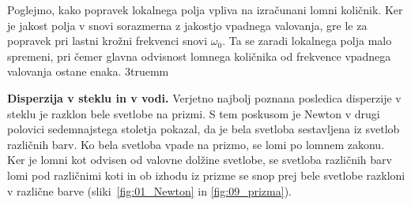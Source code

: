 Poglejmo, kako popravek lokalnega polja vpliva na izračunani lomni količnik. Ker je
jakost polja v snovi sorazmerna z jakostjo vpadnega valovanja, gre le za popravek
pri lastni krožni frekvenci snovi $\omega_0$. Ta se zaradi lokalnega polja malo
spremeni, pri čemer glavna odvisnost lomnega količnika od frekvence vpadnega
valovanja ostane enaka.
\vglue3truemm
\begin{example}{\bf Disperzija v steklu in v vodi.}
Verjetno najbolj poznana posledica disperzije v steklu je razklon bele svetlobe
na prizmi. S tem poskusom je Newton v drugi polovici sedemnajstega stoletja
pokazal, da je bela svetloba sestavljena iz svetlob različnih barv. Ko bela
svetloba vpade na prizmo, se lomi po lomnem zakonu. Ker je lomni kot odvisen
od valovne dolžine svetlobe, se svetloba različnih barv lomi pod različnimi
koti in ob izhodu iz prizme se snop prej bele svetlobe razkloni v različne
barve (sliki~\ref{fig:01_Newton} in \ref{fig:09_prizma}).


\end{example}
